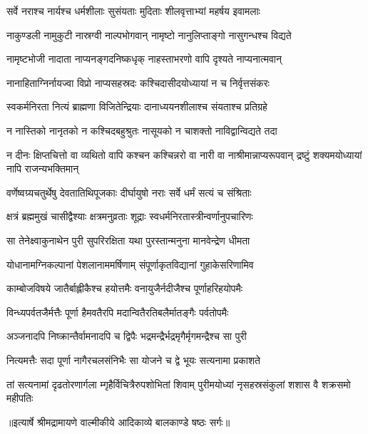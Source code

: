 \twolineshloka
{सर्वे नराश्च नार्यश्च धर्मशीलाः सुसंयताः}
{मुदिताः शीलवृत्ताभ्यां महर्षय इवामलाः} %

\twolineshloka
{नाकुण्डली नामुकुटी नास्रग्वी नाल्पभोगवान्}
{नामृष्टो नानुलिप्ताङ्गो नासुगन्धश्च विद्यते} %

\twolineshloka
{नामृष्टभोजी नादाता नाप्यनङ्गदनिष्कधृक्}
{नाहस्ताभरणो वापि दृश्यते नाप्यनात्मवान्} %

\twolineshloka
{नानाहिताग्निर्नायज्वा विप्रो नाप्यसहस्रदः}
{कश्चिदासीदयोध्यायां न च निर्वृत्तसंकरः} %

\twolineshloka
{स्वकर्मनिरता नित्यं ब्राह्मणा विजितेन्द्रियाः}
{दानाध्ययनशीलाश्च संयताश्च प्रतिग्रहे} %

\twolineshloka
{न नास्तिको नानृतको न कश्चिदबहुश्रुतः}
{नासूयको न चाशक्तो नाविद्वान्विद्यते तदा} %

\threelineshloka
{न दीनः क्षिप्तचित्तो वा व्यथितो वापि कश्चन}
{कश्चिन्नरो वा नारी वा नाश्रीमान्नाप्यरूपवान्}
{द्रष्टुं शक्यमयोध्यायां नापि राजन्यभक्तिमान्} %

\twolineshloka
{वर्णेष्वग्र्यचतुर्थेषु देवतातिथिपूजकाः}
{दीर्घायुषो नराः सर्वे धर्मं सत्यं च संश्रिताः} %

\twolineshloka
{क्षत्रं ब्रह्ममुखं चासीद्वैश्याः क्षत्रमनुव्रताः}
{शूद्राः स्वधर्मनिरतास्त्रीन्वर्णानुपचारिणः} %

\twolineshloka
{सा तेनेक्ष्वाकुनाथेन पुरी सुपरिरक्षिता}
{यथा पुरस्तान्मनुना मानवेन्द्रेण धीमता} %

\twolineshloka
{योधानामग्निकल्पानां पेशलानाममर्षिणाम्}
{संपूर्णाकृतविद्यानां गुहाकेसरिणामिव} %

\twolineshloka
{काम्बोजविषये जातैर्बाह्लीकैश्च हयोत्तमैः}
{वनायुजैर्नदीजैश्च पूर्णाहरिहयोपमैः} %

\twolineshloka
{विन्ध्यपर्वतजैर्मत्तैः पूर्णा हैमवतैरपि}
{मदान्वितैरतिबलैर्मातङ्गैः पर्वतोपमैः} %

\twolineshloka
{अञ्जनादपि निष्क्रान्तैर्वामनादपि च द्विपैः}
{भद्रमन्द्रैर्भद्रमृगैर्मृगमन्द्रैश्च सा पुरी} %

\twolineshloka
{नित्यमत्तैः सदा पूर्णा नागैरचलसंनिभैः}
{सा योजने च द्वे भूयः सत्यनामा प्रकाशते} %

\fourlineindentedshloka
{तां सत्यनामां दृढतोरणार्गला}
{म्गृहैर्विचित्रैरुपशोभितां शिवाम्}
{पुरीमयोध्यां नृसहस्रसंकुलां}
{ शशास वै शक्रसमो महीपतिः} %


{॥इत्यार्षे श्रीमद्रामायणे वाल्मीकीये आदिकाव्ये बालकाण्डे षष्ठः सर्गः॥}

